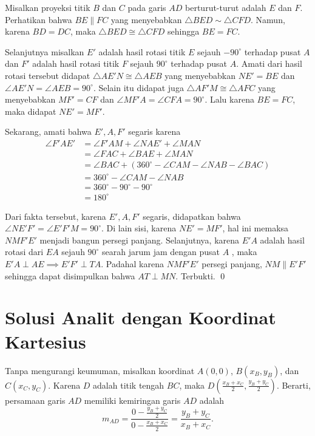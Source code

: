 Misalkan proyeksi titik $B$ dan $C$ pada garis $AD$ berturut-turut adalah $E$ dan $F$. Perhatikan bahwa $BE \parallel FC$ yang menyebabkan $\triangle BED \sim \triangle CFD$. Namun, karena $BD=DC$, maka $\triangle BED \cong \triangle CFD$ sehingga $BE=FC$. 

Selanjutnya misalkan $E'$ adalah hasil rotasi titik $E$ sejauh $-90^\circ$ terhadap pusat $A$ dan $F'$  adalah hasil rotasi titik $F$ sejauh $90^\circ$ terhadap pusat $A$. Amati dari hasil rotasi tersebut didapat $\triangle AE'N \cong \triangle AEB$ yang menyebabkan $NE'=BE$ dan $\angle AE'N = \angle AEB = 90^\circ$. Selain itu didapat juga $\triangle AF'M \cong \triangle AFC$ yang menyebabkan $MF'=CF$ dan $\angle MF'A = \angle CFA = 90^\circ$. Lalu karena $BE=FC$,  maka didapat $NE'=MF'$.

Sekarang, amati bahwa $E',A,F'$ segaris karena
\begin{equation*}
\begin{split}
\angle F'AE' &= \angle F'AM + \angle NAE' +  \angle MAN\\
			&= \angle FAC + \angle BAE + \angle MAN\\
			&= \angle BAC + (360^\circ - \angle CAM - \angle NAB - \angle BAC)\\
			&= 360^\circ - \angle CAM - \angle NAB\\
			&= 360^\circ - 90^\circ - 90^\circ\\
			&= 180^\circ
\end{split}
\end{equation*}

Dari fakta tersebut, karena $E',A,F'$ segaris, didapatkan bahwa $\angle NE'F' = \angle E'F'M=90^\circ$. Di lain sisi, karena $NE' = MF'$, hal ini memaksa $NMF'E'$ menjadi bangun persegi panjang. Selanjutnya, karena $E'A$ adalah hasil rotasi dari $EA$ sejauh $90^\circ$ searah jarum jam dengan pusat $A$ , maka $E'A \perp AE \implies E'F' \perp TA$. Padahal karena $NMF'E'$ persegi panjang, $NM \parallel E'F'$ sehingga dapat disimpulkan bahwa $AT \perp MN$. Terbukti. \qed

\newpage
\section{Solusi Analit dengan Koordinat Kartesius}
Tanpa mengurangi keumuman, misalkan koordinat $A(0,0)$, $B(x_B,y_B)$, dan $C(x_C,y_C)$. Karena $D$ adalah titik tengah $BC$, maka $D(\frac{x_B+x_C}{2},\frac{y_B+y_C}{2})$. Berarti, persamaan garis $AD$ memiliki kemiringan garis $AD$ adalah
$$m_{AD}=\dfrac{0-\frac{y_B+y_C}{2}}{0-\frac{x_B+x_C}{2}}=\dfrac{y_B+y_C}{x_B+x_C}.$$


